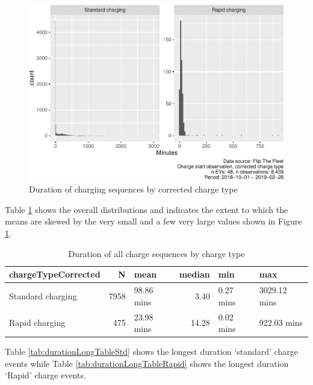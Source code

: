 \documentclass[]{article}
\begin{document}
\begin{figure}
\centering
\includegraphics{EVBB_report_v1_files/figure-latex/durationHist-1.pdf}
\caption{\label{fig:durationHist}Duration of charging sequences by corrected charge type}
\end{figure}

Table \ref{tab:durationDescTable} shows the overall distributions and indicates the extent to which the means are skewed by the very small and a few very large values shown in Figure \ref{fig:durationHist}.

\begin{table}[t]

\caption{\label{tab:durationDescTable}Duration of all charge sequences by charge type}
\centering
\begin{tabular}{l|r|l|r|l|l}
\hline
chargeTypeCorrected & N & mean & median & min & max\\
\hline
Standard charging & 7958 & 98.86 mins & 3.40 & 0.27 mins & 3029.12 mins\\
\hline
Rapid charging & 475 & 23.98 mins & 14.28 & 0.02 mins & 922.03 mins\\
\hline
\end{tabular}
\end{table}

Table \ref{tab:durationLongTableStd} shows the longest duration `standard' charge events while Table \ref{tab:durationLongTableRapid} shows the longest duration `Rapid' charge events.
\end{document}
